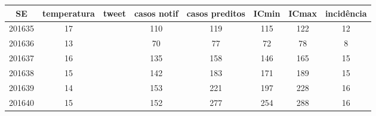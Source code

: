 \begin{tabular}{c|ccccccc}
  \hline
SE & temperatura & tweet & casos notif & casos preditos & ICmin & ICmax & incidência \\ 
  \hline
201635 & 17 &  & 110 & 119 & 115 & 122 & 12 \\ 
  201636 & 13 &  & 70 & 77 & 72 & 78 & 8 \\ 
  201637 & 16 &  & 135 & 158 & 146 & 165 & 15 \\ 
  201638 & 15 &  & 142 & 183 & 171 & 189 & 15 \\ 
  201639 & 14 &  & 153 & 221 & 197 & 228 & 16 \\ 
  201640 & 15 &  & 152 & 277 & 254 & 288 & 16 \\ 
   \hline
\end{tabular}
